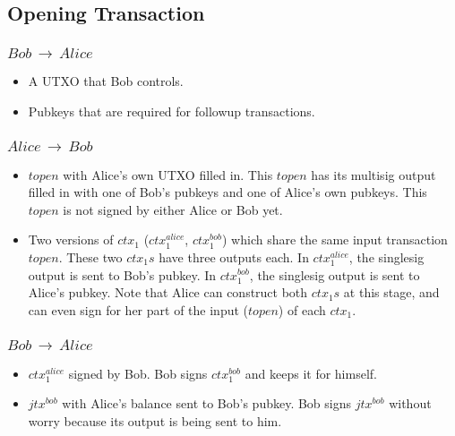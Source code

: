 \subsection{Opening Transaction}
\subsubsection{$Bob\,\to\,Alice$}
\begin{itemize}[leftmargin=4\parindent]
    \item A UTXO that Bob controls.
    \item Pubkeys that are required for followup transactions.
\end{itemize}
\subsubsection{$Alice\,\to\,Bob$}
\begin{itemize}[leftmargin=4\parindent]
    \item $\mathit{topen}$ with Alice's own UTXO filled in. This $\mathit{topen}$ has its multisig output filled in with one of Bob's pubkeys and one of Alice's own pubkeys. This $\mathit{topen}$ is not signed by either Alice or Bob yet.
    \item Two versions of $\mathit{ctx_1}$ ($\mathit{ctx_1^{alice}}$, $\mathit{ctx_1^{bob}}$) which share the same input transaction $\mathit{topen}$. These two $\mathit{ctx_1s}$ have three outputs each. In $\mathit{ctx_1^{alice}}$, the  singlesig output is sent to Bob's pubkey. In $\mathit{ctx_1^{bob}}$, the  singlesig output is sent to Alice's pubkey. Note that Alice can construct both $\mathit{ctx_1s}$ at this stage, and can even sign for her part of the input ($\mathit{topen}$) of each $\mathit{ctx_1}$.
\end{itemize}
\subsubsection{$Bob\,\to\,Alice$}
\begin{itemize}[leftmargin=4\parindent]
    \item $\mathit{ctx_1^{alice}}$ signed by Bob. Bob signs $\mathit{ctx_1^{bob}}$ and keeps it for himself.
    \item $\mathit{jtx^{bob}}$ with Alice's balance sent to Bob's pubkey. Bob signs $\mathit{jtx^{bob}}$ without worry because its output is being sent to him.
\end{itemize}
